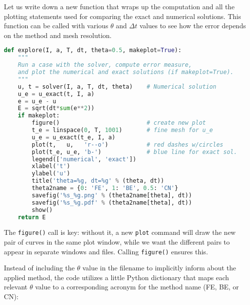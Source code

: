 \documentclass[graybox,sectrefs,envcountresetchap,open=right,final]{svmonodo}
\begin{document}
Let us write down a new function that wraps up the computation and all
the plotting statements used for comparing the exact and numerical
solutions. This function can be called with various $\theta$ and
$\Delta t$ values to see how the error depends on the method and mesh
resolution.


























\begin{lstlisting}[language=python,style=blue1_bluegreen]
def explore(I, a, T, dt, theta=0.5, makeplot=True):
    """
    Run a case with the solver, compute error measure,
    and plot the numerical and exact solutions (if makeplot=True).
    """
    u, t = solver(I, a, T, dt, theta)    # Numerical solution
    u_e = u_exact(t, I, a)
    e = u_e - u
    E = sqrt(dt*sum(e**2))
    if makeplot:
        figure()                         # create new plot
        t_e = linspace(0, T, 1001)       # fine mesh for u_e
        u_e = u_exact(t_e, I, a)
        plot(t,   u,   'r--o')           # red dashes w/circles
        plot(t_e, u_e, 'b-')             # blue line for exact sol.
        legend(['numerical', 'exact'])
        xlabel('t')
        ylabel('u')
        title('theta=%g, dt=%g' % (theta, dt))
        theta2name = {0: 'FE', 1: 'BE', 0.5: 'CN'}
        savefig('%s_%g.png' % (theta2name[theta], dt))
        savefig('%s_%g.pdf' % (theta2name[theta], dt))
        show()
    return E

\end{lstlisting}


The \texttt{figure()} call is key: without it, a new \texttt{plot} command will
draw the new pair of curves in the same plot window, while we want
the different pairs to appear in separate windows and files.
Calling \texttt{figure()} ensures this.

Instead of including the $\theta$ value in the filename to implicitly
inform about the applied method, the code utilizes a little Python
dictionary that maps each relevant $\theta$ value to a corresponding
acronym for the method name (FE, BE, or CN):
\end{document}
